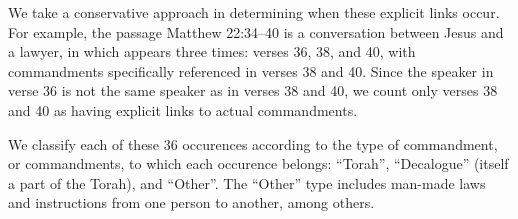 \documentclass{article}
\newcommand{\entole}{\textepsilon\textnu\texttau\textomikron\textlambda\textepsilon\xspace}
\begin{document}
We take a conservative approach in determining when these explicit links
occur.  For example, the passage Matthew 22:34--40 is a conversation between
Jesus and a lawyer, in which \entole appears three times: verses 36, 38, and 40,
with commandments specifically referenced in verses 38 and 40.  Since the
speaker in verse 36 is not the same speaker as in verses 38 and 40, we count
only verses 38 and 40 as having explicit links to actual commandments.

We classify each of these 36 occurences according to the type of commandment,
or commandments,
to which each occurence belongs: ``Torah'', ``Decalogue'' (itself a part
of the Torah), and ``Other''.  The ``Other'' type includes man-made laws
and instructions from one person to another, among others.

\footnotesize
\renewcommand\arraystretch{1}
\end{document}
